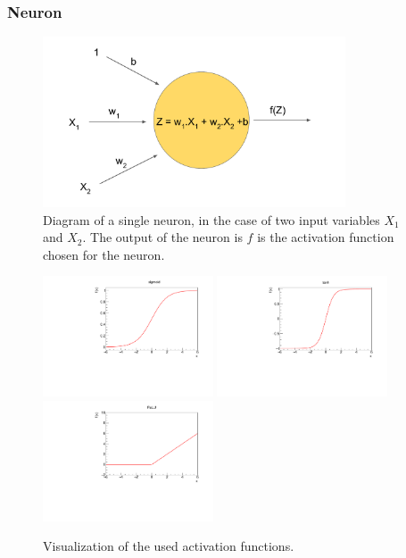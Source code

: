 \subsubsection{Neuron}

\begin{figure}
    \centering
    \includegraphics[width=0.8\textwidth]{Images/signle_neuron(1).pdf}
    \caption{Diagram of a single neuron, in the case of two input variables $X_1$ and $X_2$. The output of the neuron is $f$ is the activation function chosen for the neuron.}
    \label{fig:neuron_diagram}
\end{figure}


\begin{figure}
    \centering
    \includegraphics[width=0.45\textwidth]{Images/sigmoid.pdf}
    \includegraphics[width=0.45\textwidth]{Images/tanh.pdf}
    \includegraphics[width=0.45\textwidth]{Images/relu.pdf}
    \caption{Visualization of the used activation functions.}
    \label{fig:activation_functions}
\end{figure}

